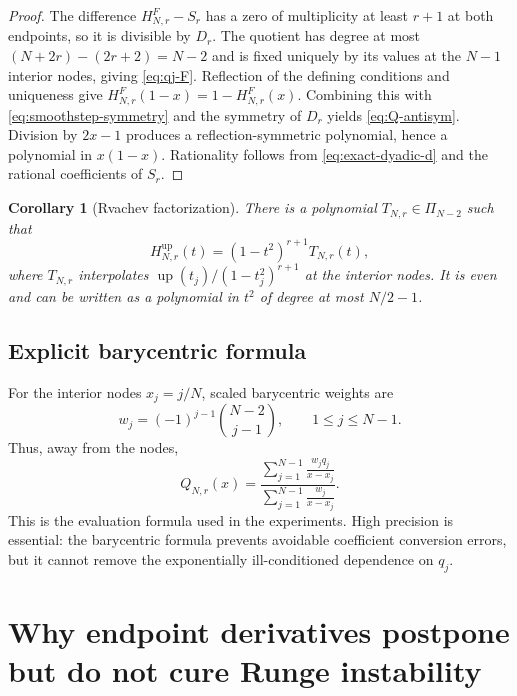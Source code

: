 \documentclass[11pt,oneside]{article}
\newtheorem{corollary}[theorem]{Corollary}
\theoremstyle{definition}
\theoremstyle{remark}
\newcommand{\Up}{\operatorname{up}}
\begin{document}
\begin{proof}
The difference $H^F_{N,r}-S_r$ has a zero of multiplicity at least $r+1$ at both endpoints,
so it is divisible by $D_r$.  The quotient has degree at most
$(N+2r)-(2r+2)=N-2$ and is fixed uniquely by its values at the $N-1$ interior nodes,
giving \eqref{eq:qj-F}.  Reflection of the defining conditions and uniqueness give
$H^F_{N,r}(1-x)=1-H^F_{N,r}(x)$.  Combining this with
\eqref{eq:smoothstep-symmetry} and the symmetry of $D_r$ yields
\eqref{eq:Q-antisym}.  Division by $2x-1$ produces a reflection-symmetric polynomial,
hence a polynomial in $x(1-x)$.  Rationality follows from
\eqref{eq:exact-dyadic-d} and the rational coefficients of $S_r$.
\end{proof}

\begin{corollary}[Rvachev factorization]
\label{cor:up-factorization}
There is a polynomial $T_{N,r}\in\Pi_{N-2}$ such that
\begin{equation}
 H^{\Up}_{N,r}(t)=(1-t^2)^{r+1}T_{N,r}(t),
 \label{eq:up-factor}
\end{equation}
where $T_{N,r}$ interpolates
$\Up(t_j)/(1-t_j^2)^{r+1}$ at the interior nodes.  It is even and can be written as a
polynomial in $t^2$ of degree at most $N/2-1$.
\end{corollary}

\subsection{Explicit barycentric formula}

For the interior nodes $x_j=j/N$, scaled barycentric weights are
\begin{equation}
 w_j=(-1)^{j-1}\binom{N-2}{j-1},\qquad1\le j\le N-1.
 \label{eq:interior-weights}
\end{equation}
Thus, away from the nodes,
\begin{equation}
 Q_{N,r}(x)=
 \frac{\displaystyle\sum_{j=1}^{N-1}\frac{w_jq_j}{x-x_j}}
 {\displaystyle\sum_{j=1}^{N-1}\frac{w_j}{x-x_j}}.
 \label{eq:bary-Q}
\end{equation}
This is the evaluation formula used in the experiments.  High precision is essential: the
barycentric formula prevents avoidable coefficient conversion errors, but it cannot remove
the exponentially ill-conditioned dependence on $q_j$.

\section{Why endpoint derivatives postpone but do not cure Runge instability}
\label{sec:instability}
\end{document}
